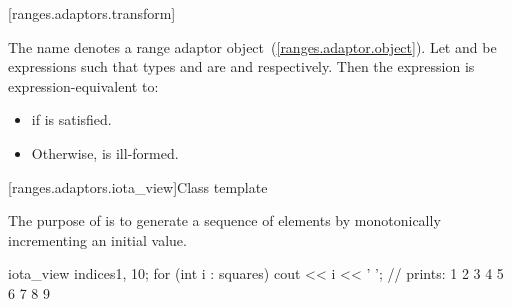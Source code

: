 [ranges.adaptors.transform]{}

\pnum
The name  denotes a range adaptor
object~(\ref{ranges.adaptor.object}). Let  and  be expressions such
that types  and  are  and 
respectively. Then the expression  is expression-equivalent to:

\begin{itemize}
\item {} if
is satisfied.
\item Otherwise,  is ill-formed.
\end{itemize}

[ranges.adaptors.iota_view]{Class template }

\pnum
The purpose of  is to generate a sequence of elements by
monotonically incrementing an initial value.


\pnum
\enterexample
\begin{codeblock}
iota_view indices{1, 10};
for (int i : squares)
  cout << i << ' '; // prints: 1 2 3 4 5 6 7 8 9
\end{codeblock}
\exitexample

